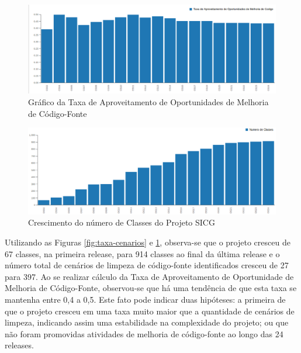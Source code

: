 \begin{figure}[H]
\centering
\includegraphics[keepaspectratio=false,scale=0.48]{figuras/taxa-grafico.eps}
\caption{Gráfico da Taxa de Aproveitamento de Oportunidades de Melhoria de Código-Fonte}
\label{fig:grafico-taxa}
\end{figure}
\FloatBarrier

\begin{figure}[H]
\centering
\includegraphics[keepaspectratio=false,scale=0.48]{figuras/crescimento-projeto.eps}
\caption{Crescimento do número de Classes do Projeto SICG}
\label{fig:crescimento-projeto}
\end{figure}
\FloatBarrier


Utilizando as Figuras \ref{fig:taxa-cenarios} e \ref{fig:grafico-taxa}, observa-se que o projeto cresceu de 67 classes, na primeira release, para 914 classes ao final da última release e o número total de cenários de limpeza de código-fonte identificados cresceu de 27 para 397. Ao se realizar cálculo da Taxa de Aproveitamento de Oportunidade de Melhoria de Código-Fonte, observou-se que há uma tendência de que esta taxa se mantenha entre 0,4 a 0,5. Este fato pode indicar duas hipóteses: a primeira de que o projeto cresceu em uma taxa muito maior que a quantidade de cenários de limpeza, indicando assim uma estabilidade na complexidade do projeto; ou que não foram promovidas atividades de melhoria de código-fonte ao longo das 24 releases.  

